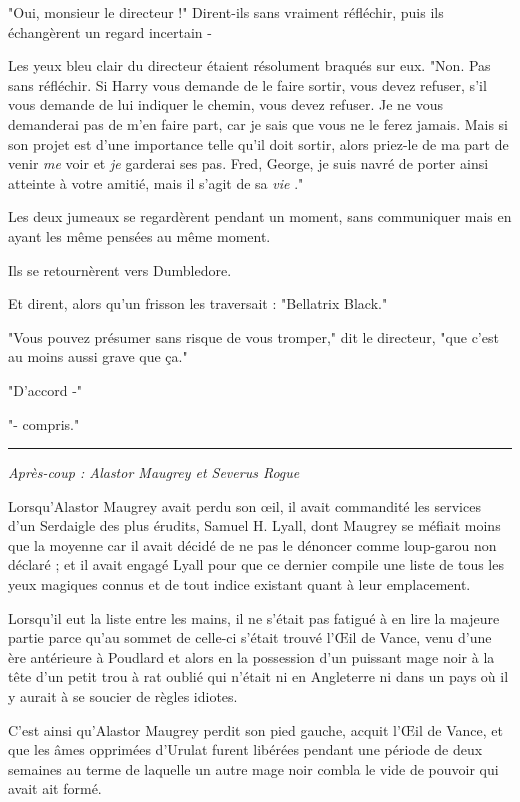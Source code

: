 "Oui, monsieur le directeur !" Dirent-ils sans vraiment réfléchir, puis ils échangèrent un regard incertain -

Les yeux bleu clair du directeur étaient résolument braqués sur eux. "Non. Pas sans réfléchir. Si Harry vous demande de le faire sortir, vous devez refuser, s'il vous demande de lui indiquer le chemin, vous devez refuser. Je ne vous demanderai pas de m'en faire part, car je sais que vous ne le ferez jamais. Mais si son projet est d'une importance telle qu'il doit sortir, alors priez-le de ma part de venir \emph{me}  voir et \emph{je}  garderai ses pas. Fred, George, je suis navré de porter ainsi atteinte à votre amitié, mais il s'agit de sa \emph{vie} ."

Les deux jumeaux se regardèrent pendant un moment, sans communiquer mais en ayant les même pensées au même moment.

Ils se retournèrent vers Dumbledore.

Et dirent, alors qu'un frisson les traversait : "Bellatrix Black."

"Vous pouvez présumer sans risque de vous tromper," dit le directeur, "que c'est au moins aussi grave que ça."

"D'accord -"

"- compris."
\par\noindent\rule{\textwidth}{0.4pt}
\emph{Après-coup : Alastor Maugrey et Severus Rogue} 

Lorsqu'Alastor Maugrey avait perdu son œil, il avait commandité les services d'un Serdaigle des plus érudits, Samuel H. Lyall, dont Maugrey se méfiait moins que la moyenne car il avait décidé de ne pas le dénoncer comme loup-garou non déclaré ; et il avait engagé Lyall pour que ce dernier compile une liste de tous les yeux magiques connus et de tout indice existant quant à leur emplacement.

Lorsqu'il eut la liste entre les mains, il ne s'était pas fatigué à en lire la majeure partie parce qu'au sommet de celle-ci s'était trouvé l'Œil de Vance, venu d'une ère antérieure à Poudlard et alors en la possession d'un puissant mage noir à la tête d'un petit trou à rat oublié qui n'était ni en Angleterre ni dans un pays où il y aurait à se soucier de règles idiotes.

C'est ainsi qu'Alastor Maugrey perdit son pied gauche, acquit l'Œil de Vance, et que les âmes opprimées d'Urulat furent libérées pendant une période de deux semaines au terme de laquelle un autre mage noir combla le vide de pouvoir qui avait ait formé.

